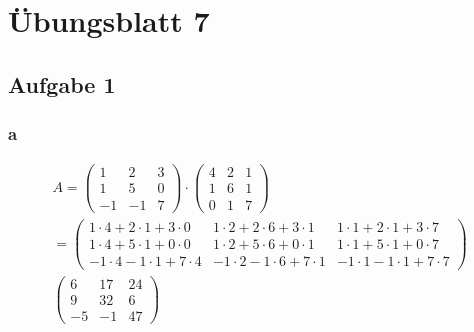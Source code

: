 \allowdisplaybreaks

\chapter{Übungsblatt 7}

\section{Aufgabe 1}

\subsection{a}
\begin{align*}
    A = \begin{pmatrix}
            1 & 2 & 3 \\ 1 & 5 & 0 \\ -1 & -1 & 7
        \end{pmatrix} \cdot \begin{pmatrix}
                                4 & 2 & 1 \\ 1 & 6 & 1 \\ 0 & 1 & 7
                            \end{pmatrix}                                                    \\
    = \begin{pmatrix}
          1 \cdot 4 + 2 \cdot 1 + 3 \cdot 0 & 1 \cdot 2 + 2 \cdot 6 + 3 \cdot 1  & 1 \cdot 1 + 2 \cdot 1 + 3 \cdot 7  \\
          1 \cdot 4 + 5 \cdot 1 + 0 \cdot 0 & 1 \cdot 2 + 5 \cdot 6 + 0 \cdot 1  & 1 \cdot 1 + 5 \cdot 1 + 0 \cdot 7  \\
          -1 \cdot 4 -1 \cdot 1 + 7 \cdot 4 & -1 \cdot 2 - 1 \cdot 6 + 7 \cdot 1 & -1 \cdot 1 - 1 \cdot 1 + 7 \cdot 7
      \end{pmatrix} \\
    \begin{pmatrix}
        6 & 17 & 24 \\ 9 & 32 & 6 \\ -5 & -1 & 47
    \end{pmatrix}
\end{align*}

